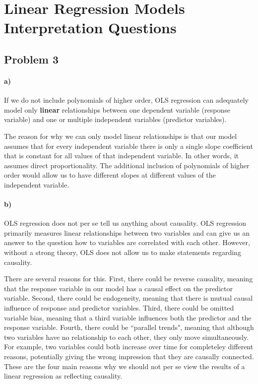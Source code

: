\documentclass[12pt]{article}\usepackage[]{graphicx}\usepackage[]{color}
\newenvironment{knitrout}{}{} %
\begin{document}
\begin{knitrout}
\end{knitrout}



\section*{Linear Regression Models Interpretation Questions}

\subsection*{Problem 3}

\paragraph*{a)} If we do not include polynomials of higher order, OLS regression can adequately model only \textbf{linear} relationships between one dependent variable (response variable) and one or multiple independent variables (predictor variables).

The reason for why we can only model linear relationships is that our model assumes that for every independent variable there is only a single slope coefficient that is constant for all values of that independent variable. In other words, it assumes direct proportionality. The additional inclusion of polynomials of higher order would allow us to have different slopes at different values of the independent variable.

\paragraph*{b)} OLS regression does not per se tell us anything about causality. OLS regression primarily measures linear relationships between two variables and can give us an answer to the question how to variables are correlated with each other. However, without a strong theory, OLS does not allow us to make statements regarding causality.

There are several reasons for this. First, there could be reverse causality, meaning that the response variable in our model has a causal effect on the predictor variable. Second, there could be endogeneity, meaning that there is mutual causal influence of response and predictor variables. Third, there could be omitted variable bias, meaning that a third variable influences both the predictor and the response variable. Fourth, there could be ``parallel trends", meaning that although two variables have no relationship to each other, they only move simultaneously. For example, two variables could both increase over time for completeley different reasons, potentially giving the wrong impression that they are causally connected. These are the four main reasons why we should not per se view the results of a linear regression as reflecting causality.
\end{document}
